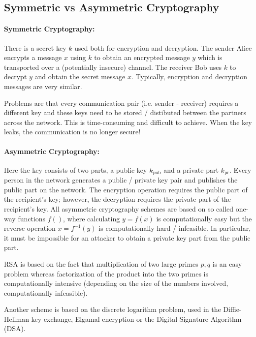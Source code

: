 
\subsection{Symmetric vs Asymmetric Cryptography}

\paragraph{Symmetric Cryptography:} There is a secret key $k$ used both for encryption and decryption. The sender Alice encrypts a message $x$ using $k$ to obtain an encrypted message $y$ which is transported over a (potentially insecure) channel. The receiver Bob uses $k$ to decrypt $y$ and obtain the secret message $x$. Typically, encryption and decryption messages are very similar.

Problems are that every communication pair (i.e. sender - receiver) requires a different key and these keys need to be stored / distibuted between the partners across the network. This is time-consuming and difficult to achieve. When the key leaks, the communication is no longer secure!

\paragraph{Asymmetric Cryptography:} Here the key consists of two parts, a public key $k_{\text{pub}}$ and a private part $k_{\text{pr}}$. Every person in the network generates a public / private key pair and publishes the public part on the network. The encryption operation requires the public part of the recipient's key; however, the decryption requires the private part of the recipient's key. All asymmetric cryptography schemes are based on so called one-way functions $f()$, where calculating $y = f(x)$ is computationally easy but the reverse operation $x = f^{-1}(y)$ is computationally hard / infeasible. In particular, it must be impossible for an attacker to obtain a private key part from the public part.

RSA is based on the fact that multiplication of two large primes $p, q$ is an easy problem whereas factorization of the product into the two primes is computationally intensive (depending on the size of the numbers involved, computationally infeasible).

Another scheme is based on the discrete logarithm problem, used in the Diffie-Hellman key exchange, Elgamal encryption or the Digital Signature Algorithm (DSA).

